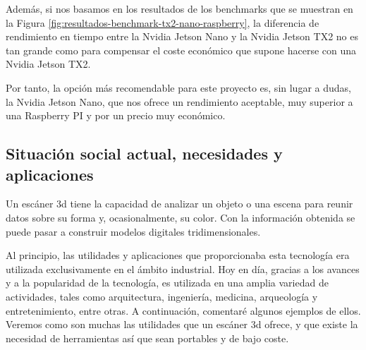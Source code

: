 Además, si nos basamos en los resultados de los benchmarks que se muestran en la Figura \ref{fig:resultados-benchmark-tx2-nano-raspberry}, la diferencia de rendimiento en tiempo entre la Nvidia Jetson Nano y la Nvidia Jetson TX2 no es tan grande como para compensar el coste económico que supone hacerse con una Nvidia Jetson TX2.

Por tanto, la opción más recomendable para este proyecto es, sin lugar a dudas, la Nvidia Jetson Nano, que nos ofrece un rendimiento aceptable, muy superior a una Raspberry PI y por un precio muy económico.




\subsection{Situación social actual, necesidades y aplicaciones}

Un escáner \gls{3d} tiene la capacidad de analizar un objeto o una escena para reunir datos sobre su forma y, ocasionalmente, su color.
Con la información obtenida se puede pasar a construir modelos digitales tridimensionales.

Al principio, las utilidades y aplicaciones que proporcionaba esta tecnología era utilizada exclusivamente en el ámbito industrial.
Hoy en día, gracias a los avances y a la popularidad de la tecnología, es utilizada en una amplia variedad de actividades, tales como arquitectura, ingeniería, medicina, arqueología y entretenimiento, entre otras.
A continuación, comentaré algunos ejemplos de ellos. Veremos como son muchas las utilidades que un escáner \gls{3d} ofrece, y que existe la necesidad de herramientas así que sean portables y de bajo coste.

